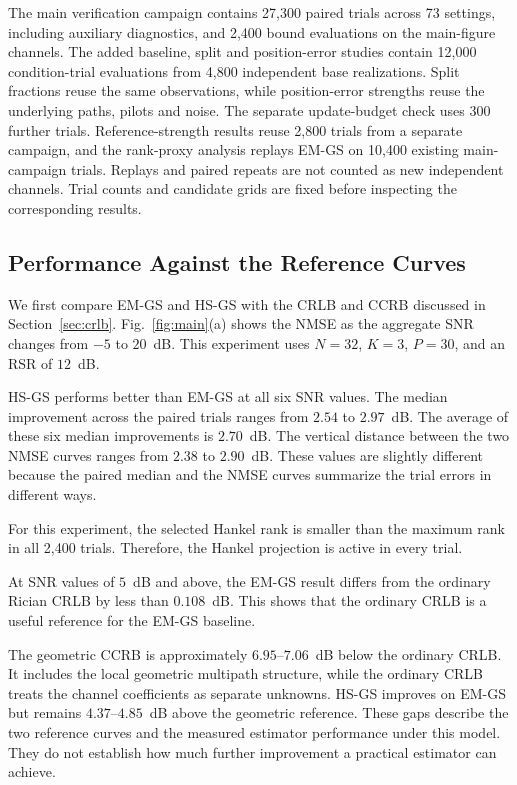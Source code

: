 \documentclass[journal]{IEEEtran}
\begin{document}
The main verification campaign contains 27,300 paired trials across
73 settings, including auxiliary diagnostics, and 2,400 bound evaluations
on the main-figure channels. The added baseline, split and position-error
studies contain 12,000 condition-trial evaluations from 4,800 independent
base realizations. Split fractions reuse the same observations, while
position-error strengths reuse the underlying paths, pilots and noise.
The separate update-budget check uses 300 further trials. Reference-strength
results reuse 2,800 trials from a separate campaign, and the rank-proxy
analysis replays EM-GS on 10,400 existing main-campaign trials. Replays and
paired repeats are not counted as new independent channels. Trial counts
and candidate grids are fixed before inspecting the corresponding results.

\subsection{Performance Against the Reference Curves}
\label{sec:main}

We first compare EM-GS and HS-GS with the CRLB and CCRB discussed in
Section~\ref{sec:crlb}. Fig.~\ref{fig:main}(a) shows the NMSE as the
aggregate SNR changes from $-5$ to $20$~dB. This experiment uses
$N=32$, $K=3$, $P=30$, and an RSR of $12$~dB.

HS-GS performs better than EM-GS at all six SNR values. The median
improvement across the paired trials ranges from $2.54$ to $2.97$~dB.
The average of these six median improvements is $2.70$~dB. The vertical
distance between the two NMSE curves ranges from $2.38$ to $2.90$~dB.
These values are slightly different because the paired median and the
NMSE curves summarize the trial errors in different ways.

For this experiment, the selected Hankel rank is smaller than the maximum
rank in all 2,400 trials. Therefore, the Hankel projection is active in
every trial.

At SNR values of $5$~dB and above, the EM-GS result differs from the
ordinary Rician CRLB by less than $0.108$~dB. This shows that the ordinary
CRLB is a useful reference for the EM-GS baseline.

The geometric CCRB is approximately $6.95$--$7.06$~dB below the ordinary
CRLB. It includes the local geometric multipath structure, while the
ordinary CRLB treats the channel coefficients as separate unknowns.
HS-GS improves on EM-GS but remains $4.37$--$4.85$~dB above the geometric
reference. These gaps describe the two reference curves and the measured
estimator performance under this model. They do not establish how much
further improvement a practical estimator can achieve.
\end{document}
